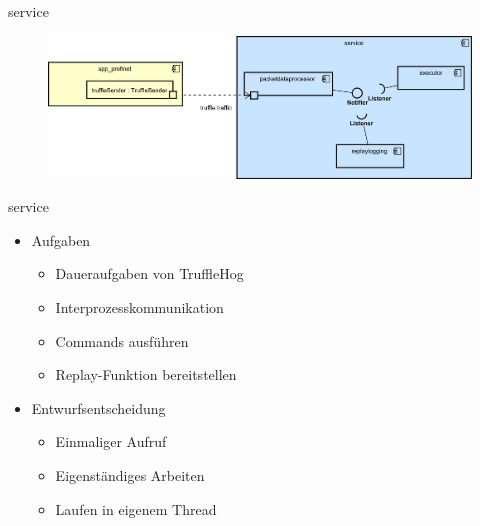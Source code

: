 \begin{frame}{service}
    \begin{figure}
    	\centering
    	\includegraphics[width=\textwidth]{./images/service.png}
    \end{figure}
\end{frame}
 \begin{frame}{service}
    \begin{itemize}[<+->]
      \item Aufgaben
        \begin{itemize}
          \item Daueraufgaben von TruffleHog
          \item Interprozesskommunikation
          \item Commands ausführen
          \item Replay-Funktion bereitstellen
        \end{itemize}
      \item Entwurfsentscheidung
        \begin{itemize}
          \item Einmaliger Aufruf
          \item Eigenständiges Arbeiten
          \item Laufen in eigenem Thread
        \end{itemize}
    \end{itemize}
\end{frame}